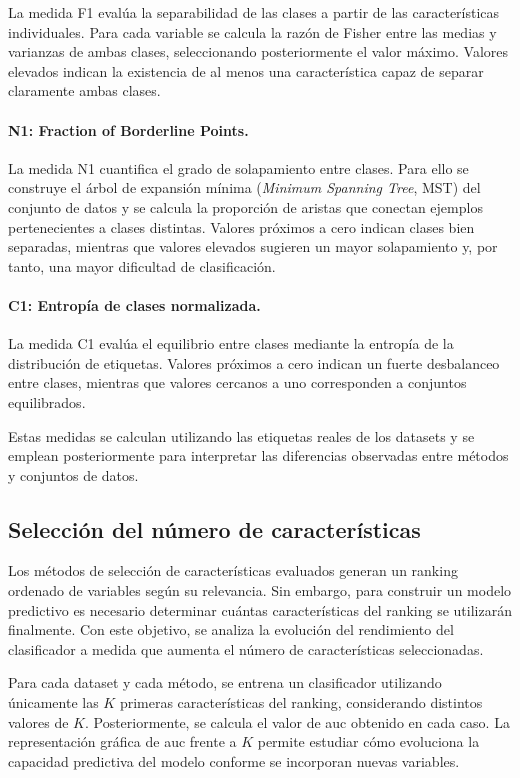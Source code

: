 La medida F1 evalúa la separabilidad de las clases a partir de las características individuales. Para cada variable se calcula la razón de Fisher entre las medias y varianzas de ambas clases, seleccionando posteriormente el valor máximo. Valores elevados indican la existencia de al menos una característica capaz de separar claramente ambas clases.

\paragraph{N1: Fraction of Borderline Points.}

La medida N1 cuantifica el grado de solapamiento entre clases. Para ello se construye el árbol de expansión mínima (\textit{Minimum Spanning Tree}, MST) del conjunto de datos y se calcula la proporción de aristas que conectan ejemplos pertenecientes a clases distintas. Valores próximos a cero indican clases bien separadas, mientras que valores elevados sugieren un mayor solapamiento y, por tanto, una mayor dificultad de clasificación.

\paragraph{C1: Entropía de clases normalizada.}

La medida C1 evalúa el equilibrio entre clases mediante la entropía de la distribución de etiquetas. Valores próximos a cero indican un fuerte desbalanceo entre clases, mientras que valores cercanos a uno corresponden a conjuntos equilibrados.

Estas medidas se calculan utilizando las etiquetas reales de los datasets y se emplean posteriormente para interpretar las diferencias observadas entre métodos y conjuntos de datos.

\subsection{Selección del número de características}
\label{subsec:seleccion_k}

Los métodos de selección de características evaluados generan un ranking ordenado de variables según su relevancia. Sin embargo, para construir un modelo predictivo es necesario determinar cuántas características del ranking se utilizarán finalmente. Con este objetivo, se analiza la evolución del rendimiento del clasificador a medida que aumenta el número de características seleccionadas.

Para cada dataset y cada método, se entrena un clasificador utilizando únicamente las $K$ primeras características del ranking, considerando distintos valores de $K$. Posteriormente, se calcula el valor de \acrshort{auc} obtenido en cada caso. La representación gráfica de \acrshort{auc} frente a $K$ permite estudiar cómo evoluciona la capacidad predictiva del modelo conforme se incorporan nuevas variables.


